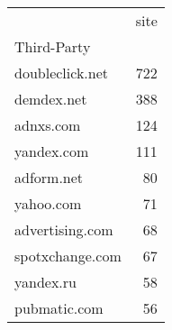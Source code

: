 \begin{tabular}{lr}
 & site \\
Third-Party &  \\
doubleclick.net & 722 \\
demdex.net & 388 \\
adnxs.com & 124 \\
yandex.com & 111 \\
adform.net & 80 \\
yahoo.com & 71 \\
advertising.com & 68 \\
spotxchange.com & 67 \\
yandex.ru & 58 \\
pubmatic.com & 56 \\
\end{tabular}
